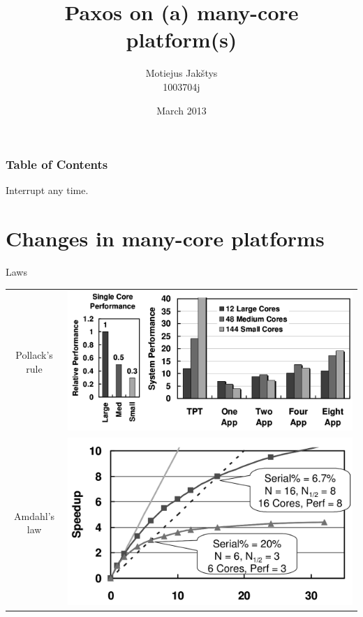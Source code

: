 \documentclass[14pt]{beamer}
\title{Paxos on (a) many-core platform(s)}
\author{Motiejus Jak\v{s}tys \\
1003704j}
\date{March 2013}
\begin{document}
\begin{frame}[plain]
    \titlepage
\end{frame}

\begin{frame}
    \frametitle{Table of Contents}
    \tableofcontents
    Interrupt any time.
\end{frame}

\section{Changes in many-core platforms}

\begin{frame}{Laws}
    \pause
    \begin{tabular}{cm{0cm}}
            Pollack's rule &
            \pause
            \includegraphics[height=0.4\textheight]{images/pollack.png}
            \\
            Amdahl's law &
            \pause
            \includegraphics[height=0.4\textheight]{images/amdahl.png} \\
    \end{tabular}
\end{frame}
\end{document}
